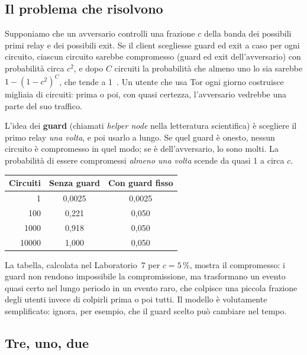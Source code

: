 \subsection{Il problema che risolvono}

Supponiamo che un avversario controlli una frazione $c$ della banda dei possibili primi relay e dei possibili exit. Se il client scegliesse guard ed exit a caso per ogni circuito, ciascun circuito sarebbe compromesso (guard ed exit dell'avversario) con probabilità circa $c^2$, e dopo $C$ circuiti la probabilità che almeno uno lo sia sarebbe $1 - (1 - c^2)^C$, che tende a 1~. Un utente che usa Tor ogni giorno costruisce migliaia di circuiti: prima o poi, con quasi certezza, l'avversario vedrebbe una parte del suo traffico.

L'idea dei \textbf{guard} (chiamati \emph{helper node} nella letteratura scientifica) è scegliere il primo relay \emph{una volta}, e poi usarlo a lungo. Se quel guard è onesto, nessun circuito è compromesso in quel modo; se è dell'avversario, lo sono molti. La probabilità di essere compromessi \emph{almeno una volta} scende da quasi 1 a circa $c$.

\begin{center}
\begin{tabular}{rcc}
\toprule
Circuiti & Senza guard & Con guard fisso \\
\midrule
1 & 0,0025 & 0,0025 \\
100 & 0,221 & 0,050 \\
\num{1000} & 0,918 & 0,050 \\
\num{10000} & 1,000 & 0,050 \\
\bottomrule
\end{tabular}
\end{center}
\noindent La tabella, calcolata nel Laboratorio~7 per $c = 5\,\%$, mostra il compromesso: i guard non rendono impossibile la compromissione, ma trasformano un evento quasi certo nel lungo periodo in un evento raro, che colpisce una piccola frazione degli utenti invece di colpirli prima o poi tutti. Il modello è volutamente semplificato: ignora, per esempio, che il guard scelto può cambiare nel tempo.

\subsection{Tre, uno, due}


